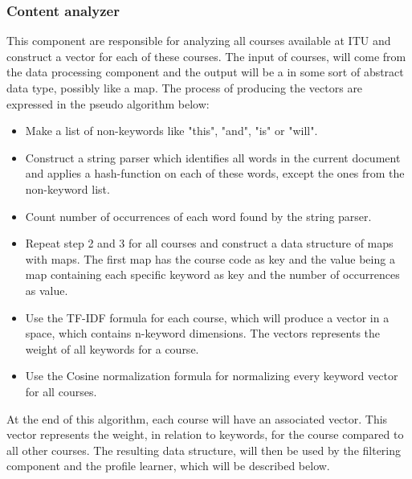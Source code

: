 \subsubsection{Content analyzer}
This component are responsible for analyzing all courses available at ITU and construct a vector for each of these courses. The input of courses, will come from the data processing component and the output will be a in some sort of abstract data type, possibly like a map. The process of producing the vectors are expressed in the pseudo algorithm below:
\begin{itemize}
	\item Make a list of non-keywords like "this", "and", "is" or "will".
	\item Construct a string parser which identifies all words in the current document and applies a hash-function on each of these words, except the ones from the non-keyword list.
	\item Count number of occurrences of each word found by the string parser.
	\item Repeat step 2 and 3 for all courses and construct a data structure of maps with maps. The first map has the course code as key and the value being a map containing each specific keyword as key and the number of occurrences as value. 
	\item Use the TF-IDF formula for each course, which will produce a vector in a space, which contains n-keyword dimensions. The vectors represents the weight of all keywords for a course.
	\item Use the Cosine normalization formula for normalizing every keyword vector for all courses.
\end{itemize}
At the end of this algorithm, each course will have an associated vector. This vector represents the weight, in relation to keywords, for the course compared to all other courses. The resulting data structure, will then be used by the filtering component and the profile learner, which will be described below.

